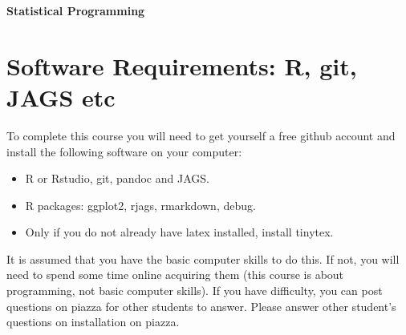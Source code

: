 \documentclass[10pt] {article}
\theoremstyle{definition}
\begin{document}
\centerline{\huge \bf Statistical Programming}

\tableofcontents


\section{Software Requirements: R, git, JAGS etc}

To complete this course you will need to get yourself a free github account and install the following software on your computer: 
\begin{itemize}
\item R or Rstudio, git, pandoc and JAGS.
\item R packages: ggplot2, rjags, rmarkdown, debug.
\item Only if you do not already have latex installed, install tinytex. 
\end{itemize}
It is assumed that you have the basic computer skills to do this. If not, you will need to spend some time online acquiring them (this course is about programming, not basic computer skills). If you have difficulty, you can post questions on piazza for other students to answer. Please answer other student's questions on installation on piazza. 
\end{document}
